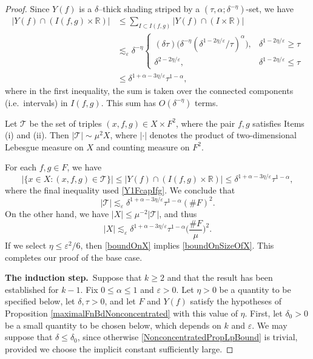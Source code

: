 \documentclass[letterpaper, reqno,11pt]{article}
\numberwithin{equation}{section}
\newcommand{\RR}{\mathbb{R}}
\newcommand{\eps}{\varepsilon}
\numberwithin{thm}{section}
\theoremstyle{remark}
\begin{document}
\begin{proof}
Since $Y(f)$ is a $\delta$--thick shading striped by a $(\tau,\alpha;\delta^{-\eta})$-set, we have
\begin{equation}\label{Y1FcapIfg}
\begin{split}
|Y(f) \cap (I(f,g)\times\RR)|& \leq \sum_{I\subset I(f,g)} |Y(f) \cap (I\times\RR)|\\
&\lesssim_\eps \delta^{-\eta} \left\{ \begin{array}{ll} 
(\delta \tau) \big(\delta^{-\eta} (\delta^{1-2\eta/\eps}/\tau)^\alpha\big),& \delta^{1-2\eta/\eps}\geq\tau\\
\delta^{2-2\eta/\eps},& \delta^{1-2\eta/\eps}\leq\tau
\end{array}
\right.\\
&\leq \delta^{1+\alpha-3\eta/\eps}\tau^{1-\alpha},
\end{split}
\end{equation}
where in the first inequality, the sum is taken over the connected components (i.e.~intervals) in $I(f,g)$. This sum has $O(\delta^{-\eta})$ terms.




Let $\mathcal{T}$ be the set of triples $(x, f,g)\in X\times F^2$, where the pair $f,g$ satisfies Items (i) and (ii). Then $|\mathcal{T}|\sim \mu^2 X$, where $|\cdot|$ denotes the product of two-dimensional Lebesgue measure on $X$ and counting measure on $F^2$.

For each $f,g\in F$, we have
\[
|\{x\in X\colon (x, f,g)\in \mathcal{T}\}| \leq  |Y(f) \cap (I(f,g)\times\RR)|\leq \delta^{1+\alpha-3\eta/\eps}\tau^{1-\alpha},
\]
where the final inequality used \eqref{Y1FcapIfg}. We conclude that 
%
\[
|\mathcal{T}|\lesssim_\eps  \delta^{1+\alpha-3\eta/\eps}\tau^{1-\alpha}(\#F)^2.
\]
On the other hand, we have $|X|\leq \mu^{-2}|\mathcal{T}|$, and thus
\begin{equation}\label{boundOnX}
|X|\lesssim_\eps  \delta^{1+\alpha-3\eta/\eps}\tau^{1-\alpha}\Big(\frac{\#F}{\mu}\Big)^2.
\end{equation}
If we select $\eta\leq \eps^2/6$, then \eqref{boundOnX} implies \eqref{boundOnSizeOfX}. This completes our proof of the base case.

\medskip

\noindent \textbf{The induction step.}\ 
Suppose that $k\geq 2$ and that the result has been established for $k-1$. Fix $0\leq\alpha\leq 1$ and $\eps>0$. Let $\eta>0$ be a quantity to be specified below, let $\delta,\tau>0$, and let $F$ and $Y(f)$ satisfy the hypotheses of Proposition \ref{maximalFnBdNonconcentrated} with this value of $\eta$. First, let $\delta_0>0$ be a small quantity to be chosen below, which depends on $k$ and $\eps$. We may suppose that $\delta\leq\delta_0$, since otherwise \eqref{NonconcentratedPropLpBound} is trivial, provided we choose the implicit constant sufficiently large.  


\end{proof}
\end{document}
